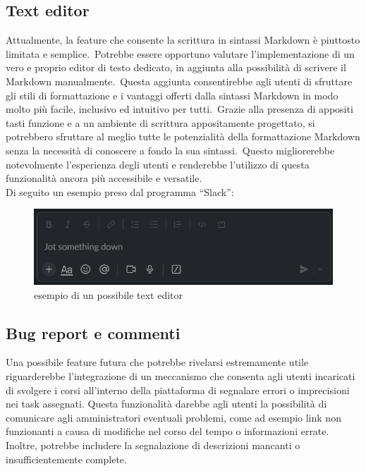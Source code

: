 \subsection{Text editor}\label{sec:cap_sec_subsec}
Attualmente, la feature che consente la scrittura in sintassi Markdown è piuttosto limitata e semplice.\
Potrebbe essere opportuno valutare l'implementazione di un vero e proprio editor di testo dedicato, 
in aggiunta alla possibilità di scrivere il Markdown manualmente.\ Questa aggiunta consentirebbe agli 
utenti di sfruttare gli stili di formattazione e i vantaggi offerti dalla sintassi Markdown in modo molto più facile, 
inclusivo ed intuitivo per tutti.\ Grazie alla presenza di appositi tasti funzione e a un ambiente di scrittura 
appositamente progettato, si potrebbero sfruttare al meglio tutte le potenzialità della formattazione Markdown 
senza la necessità di conoscere a fondo la sua sintassi.\ Questo migliorerebbe notevolmente l'esperienza degli 
utenti e renderebbe l'utilizzo di questa funzionalità ancora più accessibile e versatile.
\\
Di seguito un esempio preso dal programma ``Slack'':
\begin{figure}[ht]
	\centering
	\includegraphics[width=1\textwidth]{img/textEditor.png}
	\caption{esempio di un possibile text editor}
	\label{fig:one}
\end{figure}
%
%
\subsection{Bug report e commenti}\label{sec:cap_sec_subsec}
Una possibile feature futura che potrebbe rivelarsi estremamente utile riguarderebbe l'integrazione di un meccanismo che consenta agli utenti incaricati di svolgere i corsi all'interno della piattaforma di segnalare errori o imprecisioni nei task assegnati. Questa funzionalità darebbe agli utenti la possibilità di comunicare agli amministratori eventuali problemi, come ad esempio link non funzionanti a causa di modifiche nel corso del tempo o informazioni errate. Inoltre, potrebbe includere la segnalazione di descrizioni mancanti o insufficientemente complete.

